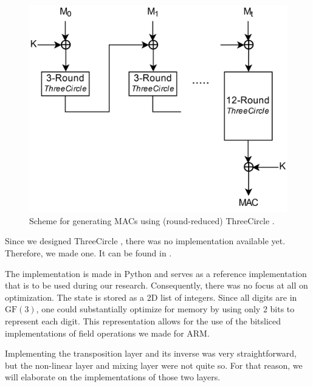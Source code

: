 \documentclass{report}
\newcommand{\GF}{\text{GF}}
\newcommand{\ThreeCircle}{{\sc ThreeCircle} }
\begin{document}
\begin{figure}[!ht]
\centering
\includegraphics[scale=0.125]{imgs/HMAC_HighRes_ThreeCircle.png}
\caption{Scheme for generating MACs using (round-reduced) \ThreeCircle.}
\label{fig:mac3c}
\end{figure}

Since we designed \ThreeCircle, there was no implementation available yet. Therefore, we made one. It can be found in .

The implementation is made in Python and serves as a reference implementation that is to be used during our research. Consequently, there was no focus at all on optimization. The state is stored as a 2D list of integers. Since all digits are in $\GF(3)$, one could substantially optimize for memory by using only 2 bits to represent each digit. This representation allows for the use of the bitsliced implementations of field operations we made for ARM.

Implementing the transposition layer and its inverse was very straightforward, but the non-linear layer and mixing layer were not quite so. For that reason, we will elaborate on the implementations of those two layers.
\end{document}
